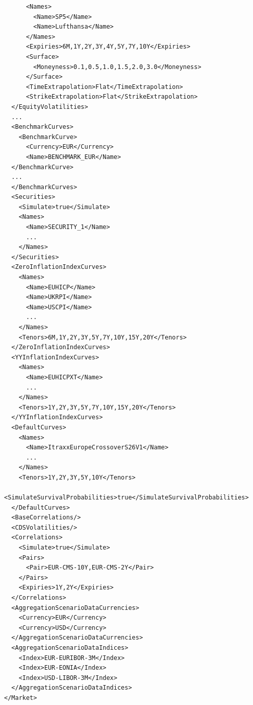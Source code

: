 \begin{longlisting}
\begin{verbatim}
      <Names>
        <Name>SP5</Name>
        <Name>Lufthansa</Name>
      </Names>
      <Expiries>6M,1Y,2Y,3Y,4Y,5Y,7Y,10Y</Expiries>
      <Surface>
        <Moneyness>0.1,0.5,1.0,1.5,2.0,3.0</Moneyness>
      </Surface>
      <TimeExtrapolation>Flat</TimeExtrapolation>
      <StrikeExtrapolation>Flat</StrikeExtrapolation>
  </EquityVolatilities>
  ...
  <BenchmarkCurves>
    <BenchmarkCurve>
      <Currency>EUR</Currency>
      <Name>BENCHMARK_EUR</Name>
  </BenchmarkCurve>
  ...
  </BenchmarkCurves>
  <Securities>
    <Simulate>true</Simulate>
    <Names>
      <Name>SECURITY_1</Name>
      ...
    </Names>
  </Securities>
  <ZeroInflationIndexCurves>
    <Names>
      <Name>EUHICP</Name>
      <Name>UKRPI</Name>
      <Name>USCPI</Name>
      ...
    </Names>
    <Tenors>6M,1Y,2Y,3Y,5Y,7Y,10Y,15Y,20Y</Tenors>
  </ZeroInflationIndexCurves>
  <YYInflationIndexCurves>
    <Names>
      <Name>EUHICPXT</Name>
      ...
    </Names>
    <Tenors>1Y,2Y,3Y,5Y,7Y,10Y,15Y,20Y</Tenors>
  </YYInflationIndexCurves>
  <DefaultCurves>
    <Names>
      <Name>ItraxxEuropeCrossoverS26V1</Name>
      ...
    </Names>
    <Tenors>1Y,2Y,3Y,5Y,10Y</Tenors>
    <SimulateSurvivalProbabilities>true</SimulateSurvivalProbabilities>
  </DefaultCurves>
  <BaseCorrelations/>
  <CDSVolatilities/>
  <Correlations>
    <Simulate>true</Simulate>
    <Pairs>
      <Pair>EUR-CMS-10Y,EUR-CMS-2Y</Pair>
    </Pairs>
    <Expiries>1Y,2Y</Expiries>
  </Correlations>
  <AggregationScenarioDataCurrencies>
    <Currency>EUR</Currency>
    <Currency>USD</Currency>
  </AggregationScenarioDataCurrencies>
  <AggregationScenarioDataIndices>
    <Index>EUR-EURIBOR-3M</Index>
    <Index>EUR-EONIA</Index>
    <Index>USD-LIBOR-3M</Index>
  </AggregationScenarioDataIndices>
</Market>
\end{verbatim}
\caption{Simulation market configuration}
\label{lst:simulation_market_configuration}
\end{longlisting}

